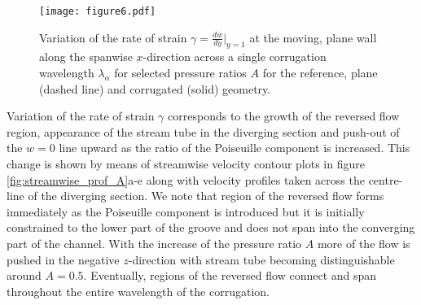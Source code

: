 \documentclass[lineno]{jfm}
\begin{document}
\begin{figure}
\centering
 \texttt{[image: figure6.pdf]}  
 \caption{Variation of the rate of strain $\gamma=\frac{dw}{dy}|_{y=1}$ at the moving, plane wall along the spanwise $x$-direction across a single corrugation wavelength $\lambda_\alpha$ for selected pressure ratios $A$ for the reference, plane (dashed line) and corrugated (solid) geometry.}
 \label{fig:rate_of_strain}
\end{figure}
Variation of the rate of strain $\gamma$ corresponds to the growth of the reversed flow region, appearance of the stream tube in the diverging section and push-out of the $w=0$ line upward as the ratio of the Poiseuille component is increased.
This change is shown by means of streamwise velocity contour plots in figure \ref{fig:streamwise_prof_A}a-e along with velocity profiles taken across the centre-line of the diverging section.
We note that region of the reversed flow forms immediately as the Poiseuille component is introduced but it is initially constrained to the lower part of the groove and does not span into the converging part of the channel.
With the increase of the pressure ratio $A$ more of the flow is pushed in the negative $z$-direction with stream tube becoming distinguishable around $A=0.5$.
Eventually, regions of the reversed flow connect and span throughout the entire wavelength of the corrugation.
\end{document}
